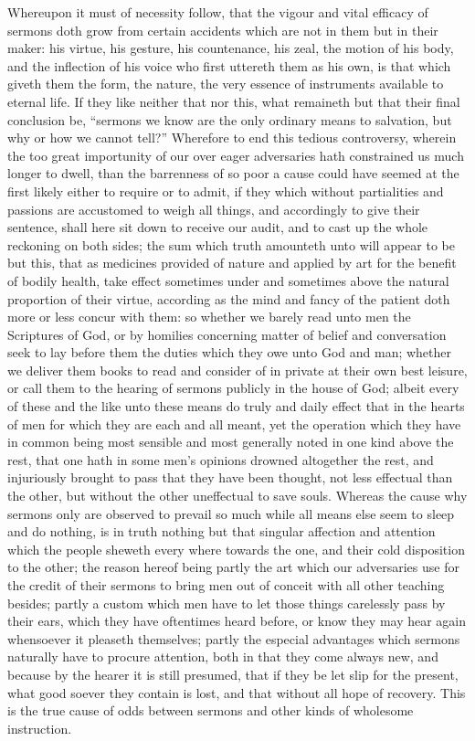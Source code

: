 Whereupon it must of necessity follow, that the vigour and vital efficacy of sermons doth grow from certain accidents which are not in them but in their maker: his virtue, his gesture, his countenance, his zeal, the motion of his body, and the inflection of his voice who first uttereth them as his own, is that which giveth them the form, the nature, the very essence of instruments available to eternal life. If they like neither that nor this, what remaineth but that their final conclusion be, “sermons we know are the only ordinary means to salvation, but why or how we cannot tell?”
Wherefore to end this tedious controversy, wherein the too great importunity of our over eager adversaries hath constrained us much longer to dwell, than the barrenness of so poor a cause could have seemed at the first likely either to  require or to admit, if they which without partialities and passions are accustomed to weigh all things, and accordingly to give their sentence, shall here sit down to receive our audit, and to cast up the whole reckoning on both sides; the sum which truth amounteth unto will appear to be but this, that as medicines provided of nature and applied by art for the benefit of bodily health, take effect sometimes under and sometimes above the natural proportion of their virtue, according as the mind and fancy of the patient doth more or less concur with them: so whether we barely read unto men the Scriptures of God, or by homilies concerning matter of belief and conversation seek to lay before them the duties which they owe unto God and man; whether we deliver them books to read and consider of in private at their own best leisure, or call them to the hearing of sermons publicly in the house of God; albeit every of these and the like unto these means do truly and daily effect that in the hearts of men for which they are each and all meant, yet the operation which they have in common being most sensible and most generally noted in one kind above the rest, that one hath in some men’s opinions drowned altogether the rest, and injuriously brought to pass that they have been thought, not less effectual than the other, but without the other uneffectual to save souls. Whereas the cause why sermons only are observed to prevail so much while all means else seem to sleep and do nothing, is in truth nothing but that singular affection and attention which the people sheweth every where towards the one, and their cold disposition to the other; the reason hereof being partly the art which our adversaries use for the credit of their sermons to bring men out of conceit with all other teaching besides; partly a custom which men have to let those things carelessly pass by their ears, which they have oftentimes heard before, or know they may hear again whensoever it pleaseth themselves; partly the especial advantages which sermons naturally have to procure attention, both in that they come always new, and because by the hearer it is still presumed, that if they be let slip for the present, what good soever they contain is lost, and that without all hope of recovery. This is the true cause of odds between sermons and other kinds of wholesome instruction.

